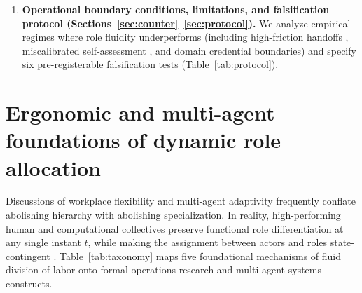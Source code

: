 \documentclass[11pt]{article}
\begin{document}
\begin{enumerate}
  \item \textbf{Operational boundary conditions, limitations, and falsification protocol (Sections~\ref{sec:counter}--\ref{sec:protocol}).} We analyze empirical regimes where role fluidity underperforms (including high-friction handoffs \citep{zhang2025agentprune}, miscalibrated self-assessment \citep{eleftheriou2026confidence}, and domain credential boundaries) and specify six pre-registerable falsification tests (Table~\ref{tab:protocol}).
\end{enumerate}

\section{Ergonomic and multi-agent foundations of dynamic role allocation}\label{sec:taxonomy}

Discussions of workplace flexibility and multi-agent adaptivity frequently conflate abolishing hierarchy with abolishing specialization. In reality, high-performing human and computational collectives preserve functional role differentiation at any single instant $t$, while making the assignment between actors and roles state-contingent \citep{ortega2001jobrotation, hopp2004chaining, li2025argdesigner}. Table~\ref{tab:taxonomy} maps five foundational mechanisms of fluid division of labor onto formal operations-research and multi-agent systems constructs.
\end{document}
